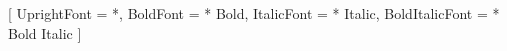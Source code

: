 \usepackage{fontspec}
\usepackage{xeCJK}
\usepackage{unicode-math}

\setmainfont{DejaVu Serif}[
  UprightFont = *,
  BoldFont = * Bold,
  ItalicFont = * Italic,
  BoldItalicFont = * Bold Italic
]

\usepackage{amsmath}
\usepackage{amssymb}
\usepackage{textgreek}

\usepackage{realscripts}

\usepackage{float}

\usepackage{needspace}
\usepackage{afterpage}

\setlength{\emergencystretch}{3em}


\usepackage{geometry}
\geometry{
  margin=2.5cm,
  includeheadfoot,
  heightrounded
}
